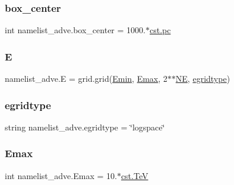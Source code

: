 \subsubsection{\texorpdfstring{box\+\_\+center}{box\_center}}
{\footnotesize\ttfamily int namelist\+\_\+adve.\+box\+\_\+center = 1000.$\ast$\hyperlink{constants_8h_a2884cd030c4c825754349a525a1d06ce}{cst.\+pc}}

\mbox{\label{namespacenamelist__adve_a14da56ce4cf78f322671d70b408bcf00}} 
\subsubsection{\texorpdfstring{E}{E}}
{\footnotesize\ttfamily namelist\+\_\+adve.\+E = grid.\+grid(\hyperlink{namespacenamelist__adve_a1792088e08a85cd9d2b3edb7928e2a2f}{Emin}, \hyperlink{namespacenamelist__adve_a4b0109a1cb1ad1d638849ef7fc9c3839}{Emax}, 2$\ast$$\ast$\hyperlink{namespacenamelist__adve_a988e38118f1948c66060053e0535ebf7}{NE}, \hyperlink{namespacenamelist__adve_a1660ec5595b36528dcc6f4062dffe3cd}{egridtype})}

\mbox{\label{namespacenamelist__adve_a1660ec5595b36528dcc6f4062dffe3cd}} 
\subsubsection{\texorpdfstring{egridtype}{egridtype}}
{\footnotesize\ttfamily string namelist\+\_\+adve.\+egridtype = \char`\"{}logspace\char`\"{}}

\mbox{\label{namespacenamelist__adve_a4b0109a1cb1ad1d638849ef7fc9c3839}} 
\subsubsection{\texorpdfstring{Emax}{Emax}}
{\footnotesize\ttfamily int namelist\+\_\+adve.\+Emax = 10.$\ast$\hyperlink{constants_8h_a7f801e1f6821bc6baf0652ed2496e5e9}{cst.\+TeV}}

\mbox{\label{namespacenamelist__adve_a1792088e08a85cd9d2b3edb7928e2a2f}} 
